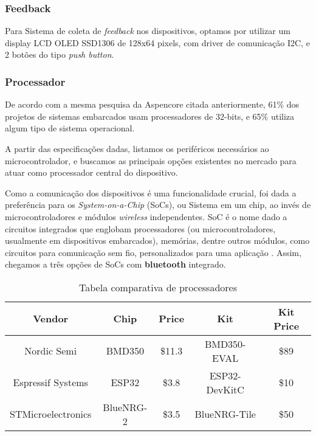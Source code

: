 \documentclass[../monografia.tex]{subfiles}
\begin{document}
\subsubsection{Feedback}

Para Sistema de coleta de \textit{feedback} nos dispositivos, optamos por utilizar um display LCD OLED\cite{oled} SSD1306 de 128x64 pixels, com driver de comunicação I2C, e 2 botões do tipo \textit{push button}. 

\subsubsection{Processador}

De acordo com a mesma pesquisa da Aspencore citada anteriormente, 61\% dos projetos de sistemas embarcados usam processadores de 32-bits, e 65\% utiliza algum tipo de sistema operacional. 

A partir das especificações dadas, listamos os periféricos necessários ao microcontrolador, e buscamos as principais opções existentes no mercado para atuar como processador central do dispositivo. 

Como a comunicação dos dispositivos é uma funcionalidade crucial, foi dada a preferência para os \textit{System-on-a-Chip} (SoCs), ou Sistema em um chip, ao invés de microcontroladores e módulos \textit{wireless} independentes. SoC é o nome dado a circuitos integrados que englobam processadores (ou microcontroladores, usualmente em dispositivos embarcados), memórias, dentre outros módulos, como circuitos para comunicação sem fio, personalizados para uma aplicação \cite{soc}. Assim, chegamos a três opções de SoCs com \textbf{bluetooth} integrado. 


\begin{center}
\begin{table}
\begin{tabular}{|c|c|c|c|c|} 
\hline
\textbf{Vendor} & \textbf{Chip} & \textbf{Price} & \textbf{Kit} & \textbf{Kit Price} \\
\hline
Nordic Semi & BMD350 & \$11.3 & BMD350-EVAL & \$89 \\ 
Espressif Systems & ESP32 & \$3.8 & ESP32-DevKitC & \$10 \\ 
STMicroelectronics & BlueNRG-2 & \$3.5 & BlueNRG-Tile & \$50 \\ 
\hline
\end{tabular}
\caption{Tabela comparativa de processadores}
\label{table}
\end{table}
\end{center}
\end{document}
